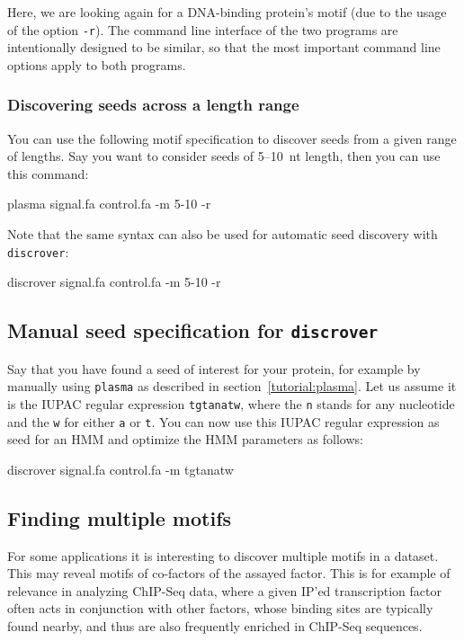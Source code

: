 \documentclass[a4paper]{article}
\newcommand{\plasma}[0]{\texttt{plasma}}
\newcommand{\discrover}[0]{\texttt{discrover}}
\begin{document}
Here, we are looking again for a DNA-binding protein's motif (due to the usage of the option \verb|-r|).
The command line interface of the two programs are intentionally designed to be similar, so that the most important command line options apply to both programs.

\subsubsection{Discovering seeds across a length range}
You can use the following motif specification to discover seeds from a given range of lengths.
Say you want to consider seeds of 5--10~nt length, then you can use this command:\\
\begin{verbbox}
plasma signal.fa control.fa -m 5-10 -r
\end{verbbox}
\fbox{\theverbbox[t]}

Note that the same syntax can also be used for automatic seed discovery with \discrover{}:
\\
\begin{verbbox}
discrover signal.fa control.fa -m 5-10 -r
\end{verbbox}
\fbox{\theverbbox[t]}



\subsection{Manual seed specification for \discrover{}}
Say that you have found a seed of interest for your protein, for example by manually using \plasma{} as described in section~\ref{tutorial:plasma}.
Let us assume it is the IUPAC regular expression \verb|tgtanatw|, where the \verb|n| stands for any nucleotide and the \verb|w| for either \verb|a| or \verb|t|.
You can now use this IUPAC regular expression as seed for an HMM and optimize the HMM parameters as follows:\\
\begin{verbbox}
discrover signal.fa control.fa -m tgtanatw
\end{verbbox}
\fbox{\theverbbox[t]}


\subsection{Finding multiple motifs}
For some applications it is interesting to discover multiple motifs in a dataset.
This may reveal motifs of co-factors of the assayed factor.
This is for example of relevance in analyzing ChIP-Seq data, where a given IP'ed transcription factor often acts in conjunction with other factors, whose binding sites are typically found nearby, and thus are also frequently enriched in ChIP-Seq sequences.
\end{document}
